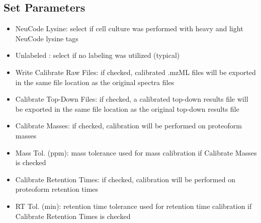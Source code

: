 \subsection{Set Parameters}
\begin{itemize}
\item NeuCode Lysine: select if cell culture was performed with heavy and light NeuCode lysine tags 
\item Unlabeled : select if no labeling was utilized (typical)
\item Write Calibrate Raw Files: if checked, calibrated .mzML files will be exported in the same file location as the original spectra files
\item Calibrate Top-Down Files: if checked, a calibrated top-down results file will be exported in the same file location as the original top-down results file
\item Calibrate Masses: if checked, calibration will be performed on proteoform masses
\item Mass Tol. (ppm): mass tolerance used for mass calibration if Calibrate Masses is checked
\item Calibrate Retention Times: if checked, calibration will be performed on proteoform retention times
\item RT Tol. (min): retention time tolerance used for retention time calibration if Calibrate Retention Times is checked
\end{itemize}

